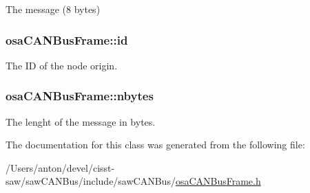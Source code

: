 The message (8 bytes) 

\hypertarget{classosa_c_a_n_bus_frame_a43c2a396a6f7dcf502daeb8f3cc8967e}{}
\subsubsection[{id}]{ osa\+C\+A\+N\+Bus\+Frame\+::id\hspace{0.3cm}{\ttfamily [protected]}}\label{classosa_c_a_n_bus_frame_a43c2a396a6f7dcf502daeb8f3cc8967e}


The I\+D of the node origin. 

\hypertarget{classosa_c_a_n_bus_frame_abc694b0742e9c5b7e2db8640caa17565}{}
\subsubsection[{nbytes}]{ osa\+C\+A\+N\+Bus\+Frame\+::nbytes\hspace{0.3cm}{\ttfamily [protected]}}\label{classosa_c_a_n_bus_frame_abc694b0742e9c5b7e2db8640caa17565}


The lenght of the message in bytes. 



The documentation for this class was generated from the following file\+:\begin{DoxyCompactItemize}
\item 
/\+Users/anton/devel/cisst-\/saw/saw\+C\+A\+N\+Bus/include/saw\+C\+A\+N\+Bus/\hyperlink{osa_c_a_n_bus_frame_8h}{osa\+C\+A\+N\+Bus\+Frame.\+h}\end{DoxyCompactItemize}
